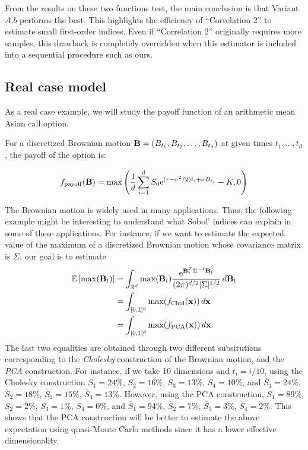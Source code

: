 From the results on these two functions test, the main conclusion is that Variant $A.b$ performs the best. This highlights the efficiency of ``Correlation 2'' to estimate small first-order indices. Even if ``Correlation 2'' originally requires more samples, this drawback is completely overridden when this estimator is included into a sequential procedure such as ours.

\subsection{Real case model}
\label{sec:5.2}
As a real case example, we will study the payoff function of an arithmetic mean Asian call option.

For a discretized Brownian motion $\boldsymbol{\mathbf{B}}=(B_{t_1}, B_{t_2},\dots, B_{t_d})$ at given times $t_1,\dots,t_d$, the payoff of the option is:

\[
f_{\rm payoff}(\boldsymbol{\mathbf{B}}) = \max\left(\frac{1}{d}\sum_{i=1}^d S_0\text{e}^{(r-\sigma^2/2)t_i+\sigma B_{t_i}}-K, 0\right)
\]

The Brownian motion is widely used in many applications. Thus, the following example might be interesting to understand what Sobol' indices can explain in some of these applications. For instance, if we want to estimate the expected value of the maximum of a discretized Brownian motion whose covariance matrix is $\Sigma$, our goal is to estimate
\begin{align*}
\mathbb{E} \left[\max(\boldsymbol{\mathbf{B}}_t)\right] &= \int_{\mathbb{R}^d} \max(\boldsymbol{\mathbf{B}}_t) \frac{{\rm e}^{\boldsymbol{\mathbf{B}}_t^T\Sigma^{-1}\boldsymbol{\mathbf{B}}_t}}{(2\pi)^{d/2}|\Sigma|^{1/2}}\,d\boldsymbol{\mathbf{B}}_t \\
&= \int_{[0,1]^d} \max(f_{\rm Chol}(\boldsymbol{\mathbf{x}})) \,d\boldsymbol{\mathbf{x}} \\
&= \int_{[0,1]^d} \max(f_{\rm PCA}(\boldsymbol{\mathbf{x}})) \,d\boldsymbol{\mathbf{x}}.
\end{align*}
The last two equalities are obtained through two different subsitutions corresponding to the \textit{Cholesky} construction of the Brownian motion, and the \textit{PCA} construction. For instance, if we take 10 dimensions and $t_i=i/10$, using the Cholesky construction $S_{1} = 24\%$, $S_{2} = 16\%$, $S_{3} = 13\%$, $S_{4} = 10\%$, and $\overline{S}_{1}=24\%$, $\overline{S}_{2}=18\%$, $\overline{S}_{3}=15\%$, $\overline{S}_{4} = 13\%$. However, using the PCA construction, $S_{1} = 89\%$, $S_{2} = 2\%$, $S_{3} = 1\%$, $S_{4} = 0\%$, and $\overline{S}_{1}=94\%$, $\overline{S}_{2}=7\%$, $\overline{S}_{3}=3\%$, $\overline{S}_{4} = 2\%$. This shows that the PCA construction will be better to estimate the above expectation using quasi-Monte Carlo methods since it has a lower effective dimensionality.


